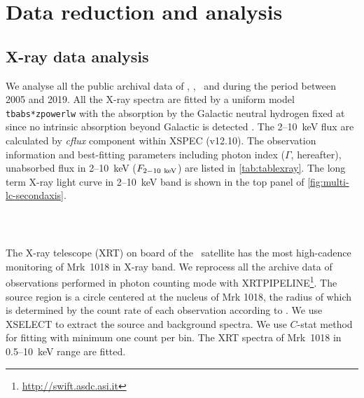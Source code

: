 \section{Data reduction and analysis}\label{sec:data}
\subsection{X-ray data analysis}
We analyse all the public archival data of \swift, \xmm, \chandra ~and \nustar during the period between 2005 and 2019. All the X-ray spectra are fitted by a uniform model \texttt{tbabs*zpowerlw} with the absorption by the Galactic neutral hydrogen fixed at \citep[$N_{\rm{HI,Gal}}=2.43 \,\times \,10^{20}\, \rm{cm}^{-2}$,][]{2005A&A...440..775K} since no intrinsic absorption beyond Galactic is detected \citep[see][]{2016A&A...593L...9H,2017A&A...607L...9K}. The 2--10~keV flux are calculated by {\it cflux} component within {\scriptsize XSPEC} (v12.10). The observation information and best-fitting parameters including photon index ($\Gamma$, hereafter), unabsorbed flux in 2--10~keV ($F_{\rm{2-10~keV}}$) are listed in \autoref{tab:tablexray}. The long term X-ray light curve in 2--10~keV band is shown in the top panel of \autoref{fig:multi-lc-secondaxis}.


\subsubsection{\xrt\,}
\label{data-xrt}
The X-ray telescope (XRT) on board of the \swift\, satellite has the most high-cadence monitoring of Mrk~1018 in X-ray band. We reprocess all the archive data of \xrt\, observations performed in photon counting mode with {\scriptsize XRTPIPELINE}\footnote{\url{http://swift.asdc.asi.it}}. The source region is a circle centered at the nucleus of Mrk 1018, the radius of which is determined by the count rate of each observation according to \citet{2009MNRAS.397.1177E}. We use {\scriptsize XSELECT} to extract the source and background spectra. We use $C$-stat method for fitting with minimum one count per bin. The XRT spectra of Mrk~1018 in 0.5--10~keV range are fitted. 




